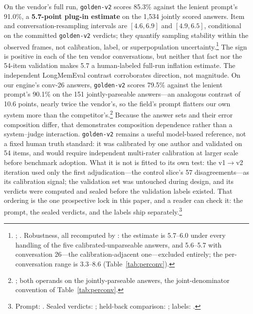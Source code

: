 \documentclass[11pt]{article}
\begin{document}
On the vendor's full run, \texttt{golden-v2} scores 85.3\% against the lenient prompt's 91.0\%, a \textbf{5.7-point plug-in estimate} on the 1{,}534 jointly scored answers. Item and conversation-resampling intervals are $[4.6,6.9]$ and $[4.9,6.5]$, conditional on the committed \texttt{golden-v2} verdicts; they quantify sampling stability within the observed frames, not calibration, label, or superpopulation uncertainty.\footnote{; . Robustness, all recomputed by : the estimate is 5.7--6.0 under every handling of the five calibrated-unparseable answers, and 5.6--5.7 with conversation 26---the calibration-adjacent one---excluded entirely; the per-conversation range is 3.3--8.6 (Table~\ref{tab:perconv}).} The sign is positive in each of the ten vendor conversations, but neither that fact nor the 54-item validation makes 5.7 a human-labeled full-run inflation estimate. The independent LongMemEval contrast corroborates direction, not magnitude. On our engine's conv-26 answers, \texttt{golden-v2} scores 79.5\% against the lenient prompt's 90.1\% on the 151 jointly-parseable answers---an analogous contrast of 10.6 points, nearly twice the vendor's, so the field's prompt flatters our own system more than the competitor's.\footnote{; both operands on the jointly-parseable answers, the joint-denominator convention of Table~\ref{tab:perconv}.} Because the answer sets and their error composition differ, that demonstrates composition dependence rather than a system--judge interaction. \texttt{golden-v2} remains a useful model-based reference, not a fixed human truth standard: it was calibrated by one author and validated on 54 items, and would require independent multi-rater calibration at larger scale before benchmark adoption. What it is not is fitted to its own test: the v1$\to$v2 iteration used only the first adjudication---the control slice's 57 disagreements---as its calibration signal; the validation set was untouched during design, and its verdicts were computed and sealed before the validation labels existed. That ordering is the one prospective lock in this paper, and a reader can check it: the prompt, the sealed verdicts, and the labels ship separately.\footnote{Prompt: . Sealed verdicts: ; held-back comparison: ; labels: .}
\end{document}
